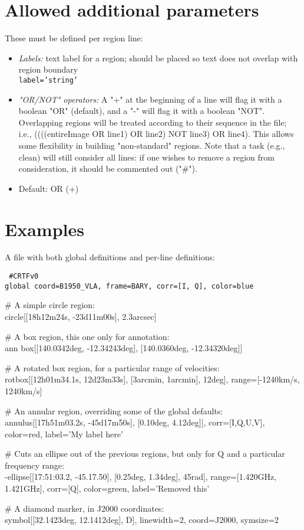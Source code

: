 \section{Allowed additional parameters}

These must be defined per region line:

\begin{itemize}

\item {\it Labels:} text label for a region; should be placed so text
  does not overlap with region boundary\\

{\tt label='string'}

\item {\it "OR/NOT" operators:} A "+" at the beginning of a line will
  flag it with a boolean "OR" (default), and a "-" will flag it with a
  boolean "NOT".  Overlapping regions will be treated according to
  their sequence in the file; i.e., ((((entireImage OR line1) OR
  line2) NOT line3) OR line4).  This allows some flexibility in
  building "non-standard" regions.  Note that a task (e.g., clean)
  will still consider all lines: if one wishes to remove a region from
  consideration, it should be commented out ("\#").

\item Default: OR (+)

\end{itemize}

\section{Examples}

A file with both global definitions and per-line definitions:

{\tt
\#CRTFv0\\
global coord=B1950\_VLA, frame=BARY, corr=[I, Q], color=blue

\# A simple circle region:\\
circle[[18h12m24s, -23d11m00s], 2.3arcsec]

\# A box region, this one only for annotation:\\
ann box[[140.0342deg, -12.34243deg], [140.0360deg, -12.34320deg]]

\# A rotated box region, for a particular range of velocities:\\
rotbox[[12h01m34.1s, 12d23m33s], [3arcmin, 1arcmin], 12deg], range=[-1240km/s, 1240km/s]

\# An annular region, overriding some of the global defaults:\\
annulus[[17h51m03.2s, -45d17m50s], [0.10deg, 4.12deg]], corr=[I,Q,U,V], color=red, label='My label here'

\# Cuts an ellipse out of the previous regions, but only for Q and a particular frequency range:\\
-ellipse[[17:51:03.2, -45.17.50], [0.25deg, 1.34deg], 45rad], range=[1.420GHz, 1.421GHz], corr=[Q], color=green, label='Removed this'

\# A diamond marker, in J2000 coordinates:\\
symbol[[32.1423deg, 12.1412deg], D], linewidth=2, coord=J2000, symsize=2

}

